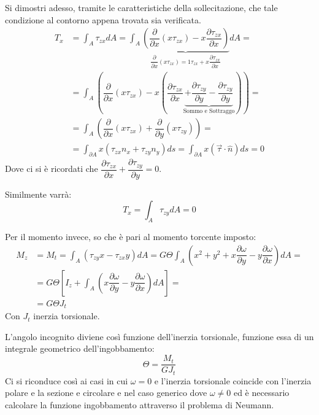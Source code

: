 		Si dimostri adesso, tramite le caratteristiche della sollecitazione, che tale condizione al contorno appena trovata sia verificata. 
		\[ \begin{split} T_x & = \int_A \tau_{zx}dA =  \int_A\underbrace{\left(\dfrac{\partial}{\partial x}(x\tau_{zx}) -x\dfrac{\partial\tau_{zx}}{\partial x}\right)}_\text{$\dfrac{\partial}{\partial x}(x\tau_{zx}) = 1\tau_{zx} +x\dfrac{\partial\tau_{zx}}{\partial x}$}dA = \\
		& = \int_A \left(\dfrac{\partial}{\partial x}(x\tau_{zx}) -x\left(\dfrac{\partial\tau_{zx}}{\partial x} \underbrace{+ \dfrac{\partial\tau_{zy}}{\partial y} - \dfrac{\partial\tau_{zy}}{\partial y}}_\text{Sommo e Sottraggo}\right)\right) = \\
		& = \int_A\left(\dfrac{\partial}{\partial x }(x\tau_{zx}) + \dfrac{\partial}{\partial y}(x\tau_{zy})\right) = \\ 
		& = \int_{\partial A} x(\tau_{zx}n_x + \tau_{zy}n_y)ds = \int_{\partial A} x(\vec{\tau}\cdot \hat{n})ds = 0	\end{split}\]
		Dove ci si è ricordati che $\dfrac{\partial\tau_{zx}}{\partial x} + \dfrac{\partial\tau_{zy}}{\partial y} =0$. \newline 
		
		Similmente varrà: 
		\[ T_x = \int_A \tau_{zy}dA = 0 \]	
		
		Per il momento invece, so che è pari al momento torcente imposto: 
		\[ \begin{split}
			M_z & = M_t = \int_A (\tau_{zy}x -\tau_{zx}y)dA = G\Theta\int_A \left(x^2 + y^2 + x\dfrac{\partial\omega}{\partial y} - y\dfrac{\partial\omega}{\partial x}\right)dA = \\
			& = G\Theta \left[ I_z + \int_A \left(x\dfrac{\partial\omega}{\partial y} - y\dfrac{\partial\omega}{\partial x}\right)dA \right] = \\
			& = G\Theta J_t
		\end{split}\]
		Con $J_t$ inerzia torsionale.
		
		L'angolo incognito diviene così funzione dell'inerzia torsionale, funzione essa di un integrale geometrico dell'ingobbamento: 
		\[ \Theta = \dfrac{M_t}{GJ_t}\]
		Ci si riconduce così ai casi in cui $\omega = 0$ e l'inerzia torsionale coincide con l'inerzia polare e la sezione e circolare e nel caso generico dove $\omega\neq 0$ ed è necessario calcolare la funzione ingobbamento attraverso il problema di Neumann. \newline 
		
